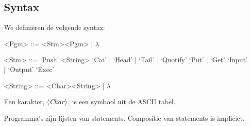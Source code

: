 \subsection{Syntax}
\label{sec:def:syn}

We definiëren de volgende syntax:

\setlength{\grammarindent}{5em}
\begin{grammar}
	<Pgm> ::= <Stm><Pgm> | $\lambda$

	<Stm> ::= `Push' <String>
		\alt `Cat' | `Head' | `Tail' | `Quotify'
		\alt `Put' | `Get'
		\alt `Input' | `Output'
		\alt `Exec'

	<String> ::= <Char><String> | $\lambda$
\end{grammar}

Een karakter, $\langle\mathit{Char}\rangle$, is een symbool uit de ASCII tabel. 

Programma's zijn lijsten van statements. Compositie van statements is
impliciet.

